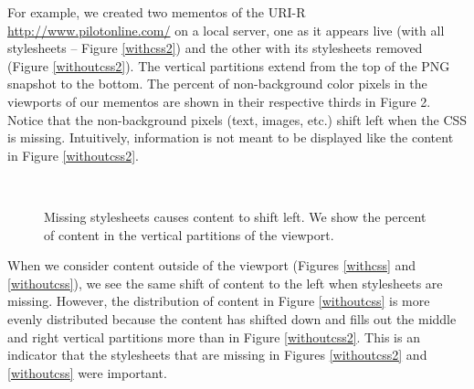 For example, we created two mementos of the URI-R \url{http://www.pilotonline.com/} on a local server, one as it appears live (with all stylesheets -- Figure \ref{withcss2}) and the other with its stylesheets removed (Figure \ref{withoutcss2}). The vertical partitions extend from the top of the PNG snapshot to the bottom.
 The percent of non-background color pixels in the viewports of our mementos are shown in their respective thirds in Figure 2. Notice that the non-background pixels (text, images, etc.) shift left when the CSS is missing. Intuitively, information is not meant to be displayed like the content in Figure \ref{withoutcss2}.

\begin{figure}[h!]
  \begin{center}
    \\
  \end{center}
  \label{pilotexample2}
  \caption{Missing stylesheets causes content to shift left. We show the percent of content in the vertical partitions of the viewport.}
\end{figure}

When we consider content outside of the viewport (Figures \ref{withcss} and \ref{withoutcss}), we see the same shift of content to the left when stylesheets are missing. However, the distribution of content in Figure \ref{withoutcss} is more evenly distributed because the content has shifted down and fills out the middle and right vertical partitions more than in Figure \ref{withoutcss2}. This is an indicator that the stylesheets that are missing in Figures \ref{withoutcss2} and \ref{withoutcss} were important.

